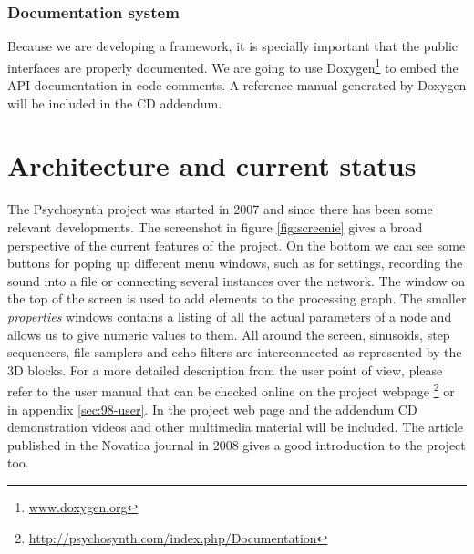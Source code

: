 \subsubsection{Documentation system}

Because we are developing a framework, it is specially important that
the public interfaces are properly documented. We are going to use
Doxygen\footnote{\url{www.doxygen.org}} to embed the
API documentation in code comments. A reference manual generated by
Doxygen will be included in the CD addendum.

\section{Architecture and current status}
\label{sec:status}

The Psychosynth project was started in 2007 and since there has been
some relevant developments. The screenshot in figure
\ref{fig:screenie} gives a broad perspective of the current features
of the project. On the bottom we can see some buttons for poping up
different menu windows, such as for settings, recording the sound into
a file or connecting several instances over the network. The window on
the top of the screen is used to add elements to the processing
graph. The smaller \emph{properties} windows contains a listing of all
the actual parameters of a node and allows us to give numeric values
to them. All around the screen, sinusoids, step sequencers, file
samplers and echo filters are interconnected as represented by the 3D
blocks.  For a more detailed description from the user point of view,
please refer to the user manual that can be checked online on the
project webpage
\footnote{\url{http://psychosynth.com/index.php/Documentation}} or in
appendix \ref{sec:98-user}. In the project web page and the addendum
CD demonstration videos and other multimedia material will be
included. The article \cite{bolivar08psychosynth} published in the
Novatica journal in 2008 gives a good introduction to the project too.

